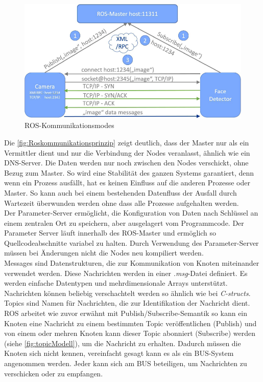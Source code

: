\begin{figure}[H]
 \centering
 \includegraphics[width=\linewidth]{Bilder/Grundlagen/ROS-Kommunikation.png}
 \caption{ROS-Kommunikationsmodes \cite{RoboterMitRos.2020}}
 \label{fig:Roskommunikationsprinzip}
\end{figure}


Die \autoref{fig:Roskommunikationsprinzip} zeigt deutlich, dass der Master nur als ein Vermittler dient und nur die Verbindung der Nodes veranlasst, ähnlich wie ein DNS-Server. Die Daten werden nur noch zwischen den Nodes verschickt, ohne Bezug zum Master. So wird eine Stabilität des ganzen Systems garantiert, denn wenn ein Prozess ausfällt, hat es keinen Einfluss auf die anderen Prozesse oder Master. So kann auch bei einem bestehenden Datenfluss der Ausfall durch Wartezeit überwunden werden ohne dass alle Prozesse aufgehalten werden. \\


Der Parameter-Server ermöglicht, die Konfiguration von Daten nach Schlüssel an einem zentralen Ort zu speichern, aber ausgelagert vom Programmcode. Der Parameter Server läuft innerhalb des ROS-Master und ermöglich so Quellcodeabschnitte variabel zu halten. Durch Verwendung des Parameter-Server müssen bei Änderungen nicht die Nodes neu kompiliert werden.\\ 
Messages sind Datenstrukturen, die zur Kommunikation von Knoten miteinander verwendet werden. Diese Nachrichten werden in einer \textit{.msg}-Datei definiert. Es werden einfache Datentypen und mehrdimensionale Arrays unterstützt. Nachrichten können beliebig verschachtelt werden so ähnlich wie bei \textit{C-structs}. \\
Topics sind Namen für Nachrichten, die zur Identifikation der Nachricht dient. ROS arbeitet wie zuvor erwähnt mit Publish/Subscribe-Semantik so kann ein Knoten eine Nachricht zu einem bestimmten Topic veröffentlichen (Publish) und von einem oder mehren Knoten kann dieser Topic abonniert (Subscribe) werden (siehe \autoref{fig:topicModell}), um die Nachricht zu erhalten. Dadurch müssen die Knoten sich nicht kennen, vereinfacht gesagt kann es als ein BUS-System angenommen werden. Jeder kann sich am BUS beteiligen, um Nachrichten zu verschicken oder zu empfangen.\\


